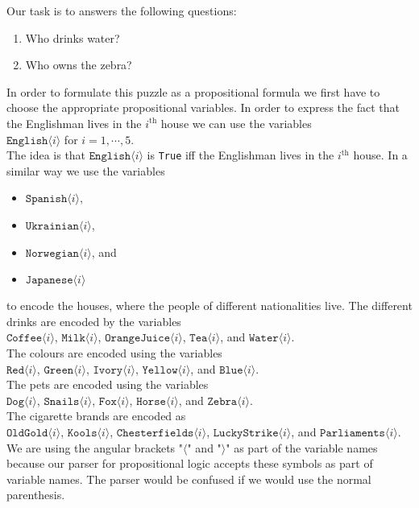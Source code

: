Our task is to answers the following questions:
\begin{enumerate}
\item Who drinks water?
\item Who owns the zebra?
\end{enumerate}

In order to formulate this puzzle as a propositional formula we first have to
choose the appropriate propositional variables.  In order to express the fact
that the Englishman lives in the $i^\textrm{th}$ house we can use the variables
\\[0.2cm]
\hspace*{1.3cm}
$\texttt{English}\langle i \rangle$ \quad for $i=1,\cdots,5$.
\\[0.2cm]
The idea is that $\texttt{English}\langle i \rangle$ is \texttt{True} iff the
Englishman lives in the  $i^\textrm{th}$ house.  In a similar way we use the
variables
\begin{itemize}
\item $\texttt{Spanish}\langle i \rangle$,
\item $\texttt{Ukrainian}\langle i \rangle$,
\item $\texttt{Norwegian}\langle i \rangle$, and 
\item $\texttt{Japanese}\langle i \rangle$
\end{itemize}
to encode the houses, where the people of different nationalities live.
The different drinks are encoded by the variables
\\[0.2cm]
\hspace*{1.3cm}
$\texttt{Coffee}\langle i \rangle$, $\texttt{Milk}\langle i \rangle$, $\texttt{OrangeJuice}\langle i \rangle$, $\texttt{Tea}\langle i \rangle$, and $\texttt{Water}\langle i \rangle$.
\\[0.2cm] 
The colours are encoded using the variables 
\\[0.2cm]
\hspace*{1.3cm}
$\texttt{Red}\langle i \rangle$,
$\texttt{Green}\langle i \rangle$,
$\texttt{Ivory}\langle i \rangle$,
$\texttt{Yellow}\langle i \rangle$, and $\texttt{Blue}\langle i \rangle$.
\\[0.2cm]
The pets are encoded using the variables
\\[0.2cm]
\hspace*{1.3cm}
$\texttt{Dog}\langle i \rangle$,
$\texttt{Snails}\langle i \rangle$,
$\texttt{Fox}\langle i \rangle$,
$\texttt{Horse}\langle i \rangle$,
and $\texttt{Zebra}\langle i \rangle$.
\\[0.2cm]
The cigarette brands are encoded as
\\[0.2cm]
\hspace*{1.3cm}
$\texttt{OldGold}\langle i \rangle$, $\texttt{Kools}\langle i \rangle$,
$\texttt{Chesterfields}\langle i \rangle$, $\texttt{LuckyStrike}\langle i \rangle$, and
$\texttt{Parliaments}\langle i \rangle$.
\\[0.2cm]
We are using the angular brackets "$\langle$" and "$\rangle$" as part of the
variable names because our parser for propositional logic accepts these symbols
as part of variable names.  The parser would be confused if we would use the
normal parenthesis. 

